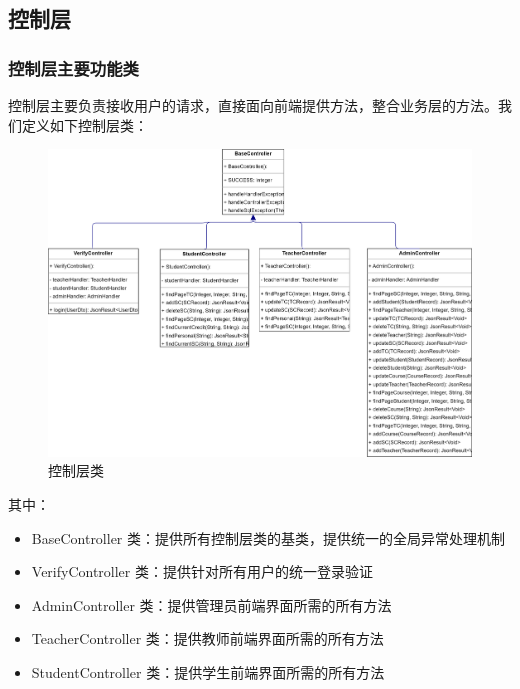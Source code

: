 \documentclass[12pt, a4paper]{article}
\begin{document}
\subsection{控制层}
\subsubsection{控制层主要功能类}
控制层主要负责接收用户的请求，直接面向前端提供方法，整合业务层的方法。我们定义如下控制层类：
\begin{figure}[H]
	\centering
	\includegraphics[width = 0.9 \textwidth]{Controller.png}
	\caption{控制层类}
\end{figure}

其中：
\begin{itemize}
	\item BaseController 类：提供所有控制层类的基类，提供统一的全局异常处理机制
	\item VerifyController 类：提供针对所有用户的统一登录验证
	\item AdminController 类：提供管理员前端界面所需的所有方法
	\item TeacherController 类：提供教师前端界面所需的所有方法
	\item StudentController 类：提供学生前端界面所需的所有方法
\end{itemize}
\end{document}
